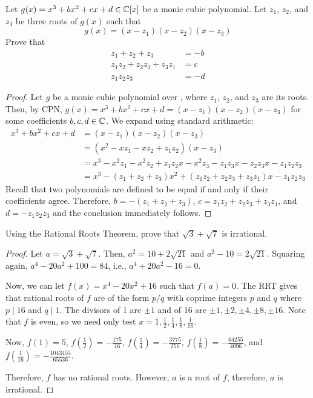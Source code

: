 \question Let $g(x)=x^3+bx^2+cx+d\in\mathbb{C}[x]$ be a monic cubic polynomial.
Let $z_1$, $z_2$, and $z_3$ be three roots of $g(x)$ such that
\[ g(x) = (x-z_1)(x-z_2)(x-z_3) \]
Prove that \begin{align*}
  z_1 + z_2 + z_3          & = -b \\
  z_1z_2 + z_2z_3 + z_3z_1 & = c  \\
  z_1z_2z_3                & = -d
\end{align*}
\begin{proof}
  Let $g$ be a monic cubic polynomial over \C, where $z_1$, $z_2$, and $z_3$ are its roots.
  Then, by CPN, $g(x) = x^3 + bx^2 + cx + d = (x-z_1)(x-z_2)(x-z_3)$ for some coefficients $b,c,d\in\mathbb{C}$.
  We expand using standard arithmetic:
  \begin{align*}
    x^3 + bx^2 + cx + d & = (x-z_1)(x-z_2)(x-z_3)                                                    \\
                        & = (x^2 - xz_1 - xz_2 + z_1z_2)(x-z_3)                                      \\
                        & = x^3 - x^2z_1 - x^2z_2 + z_1z_2x - x^2z_3 - z_1z_3x - z_2z_3x - z_1z_2z_3 \\
                        & = x^3 - (z_1 + z_2 + z_3)x^2 + (z_1z_2 + z_2z_3 + z_3z_1)x - z_1z_2z_3
  \end{align*}
  Recall that two polynomials are defined to be equal if and only if their coefficients agree.
  Therefore, $b = -(z_1+z_2+z_3)$, $c = z_1z_2 + z_2z_3 + z_3z_1$, and $d = -z_1z_2z_3$
  and the conclusion immediately follows.
\end{proof}


\question Using the Rational Roots Theorem, prove that $\sqrt 3 + \sqrt 7$ is irrational.
\begin{proof}
  Let $a = \sqrt 3 + \sqrt 7$.
  Then, $a^2 = 10 + 2\sqrt{21}$ and $a^2 - 10 = 2\sqrt{21}$.
  Squaring again, $a^4 - 20a^2 + 100 = 84$, i.e., $a^4 + 20a^2 - 16 = 0$.

  Now, we can let $f(x) = x^4 - 20x^2 + 16$ such that $f(a) = 0$.
  The RRT gives that rational roots of $f$ are of the form $p/q$ with coprime integers $p$ and $q$
  where $p \mid 16$ and $q \mid 1$. The divisors of 1 are $\pm1$ and of 16 are $\pm1,\pm2,\pm4,\pm8,\pm16$.
  Note that $f$ is even, so we need only test $x=1,\frac12,\frac14,\frac18,\frac1{16}$.

  Now, $f(1)=5$, $f(\frac12)=-\frac{175}{16}$, $f(\frac14)=-\frac{3775}{256}$,
  $f(\frac18)=-\frac{64255}{4096}$, and $f(\frac1{16})=-\frac{1043455}{65536}$.

  Therefore, $f$ has no rational roots. However, $a$ is a root of $f$, therefore, $a$ is irrational.
\end{proof}


